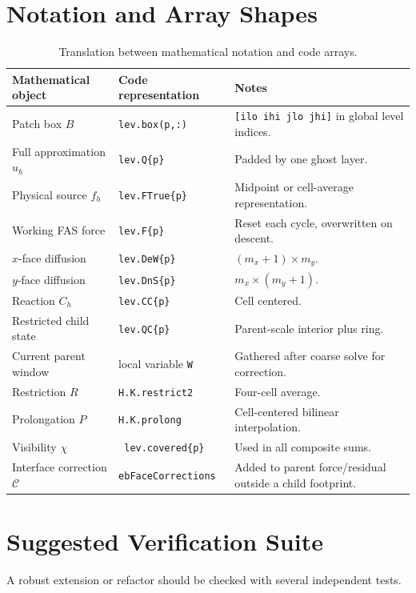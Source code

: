 \documentclass[11pt,oneside,openany]{book}
\newcommand{\code}[1]{\textnormal{\texttt{#1}}}
\begin{document}
\chapter{Notation and Array Shapes}
\label{app:notation}

\begin{table}[htbp]
\centering
\small
\begin{tabularx}{\textwidth}{@{}p{}p{}X@{}}
\toprule
Mathematical object & Code representation & Notes \\
\midrule
Patch box $B$ & \code{lev.box(p,:)} & \code{[ilo ihi jlo jhi]} in global level indices. \\
Full approximation $u_h$ & \code{lev.Q\{p\}} & Padded by one ghost layer. \\
Physical source $f_h$ & \code{lev.FTrue\{p\}} & Midpoint or cell-average representation. \\
Working FAS force & \code{lev.F\{p\}} & Reset each cycle, overwritten on descent. \\
$x$-face diffusion & \code{lev.DeW\{p\}} & $(m_x+1)\times m_y$. \\
$y$-face diffusion & \code{lev.DnS\{p\}} & $m_x\times(m_y+1)$. \\
Reaction $C_h$ & \code{lev.CC\{p\}} & Cell centered. \\
Restricted child state & \code{lev.QC\{p\}} & Parent-scale interior plus ring. \\
Current parent window & local variable \code{W} & Gathered after coarse solve for correction. \\
Restriction $R$ & \code{H.K.restrict2} & Four-cell average. \\
Prolongation $P$ & \code{H.K.prolong} & Cell-centered bilinear interpolation. \\
Visibility $\chi$ & \code{~lev.covered\{p\}} & Used in all composite sums. \\
Interface correction $\mathcal C$ & \code{ebFaceCorrections} & Added to parent force/residual outside a child footprint. \\
\bottomrule
\end{tabularx}
\caption{Translation between mathematical notation and code arrays.}
\end{table}

\chapter{Suggested Verification Suite}
\label{app:verification}
A robust extension or refactor should be checked with several independent tests.
\end{document}
